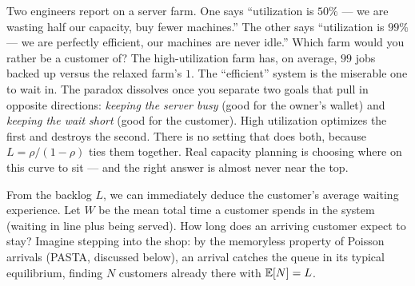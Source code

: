 \begin{paradoxbox}
Two engineers report on a server farm. One says ``utilization is $50\%$ --- we are wasting half our
capacity, buy fewer machines.'' The other says ``utilization is $99\%$ --- we are perfectly
efficient, our machines are never idle.'' Which farm would you rather be a customer of? The
high-utilization farm has, on average, $99$ jobs backed up versus the relaxed farm's $1$. The
``efficient'' system is the miserable one to wait in. The paradox dissolves once you separate two
goals that pull in opposite directions: \emph{keeping the server busy} (good for the owner's
wallet) and \emph{keeping the wait short} (good for the customer). High utilization optimizes the
first and destroys the second. There is no setting that does both, because $L = \rho/(1-\rho)$ ties
them together. Real capacity planning is choosing where on this curve to sit --- and the right answer
is almost never near the top.
\end{paradoxbox}

From the backlog $L$, we can immediately deduce the customer's average waiting experience.
Let $W$ be the mean total time a customer spends in the system (waiting in line plus being
served). How long does an arriving customer expect to stay?
Imagine stepping into the shop: by the memoryless property of Poisson arrivals (PASTA, discussed
below), an arrival catches the queue in its typical equilibrium, finding $N$ customers already
there with $\operatorname{\mathbb{E}}[N] = L$.

